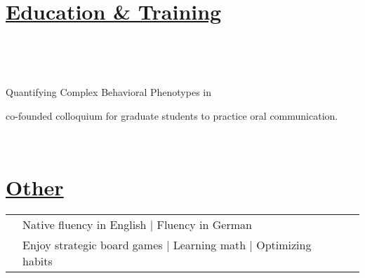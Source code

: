 \documentclass[]{winter-resume-openfont}
\begin{document}
\begin{minipage}[t]{0.65\textwidth}
\sectionsep



\section{\underline{Education \& Training}}
\sectionsep
{} \\
\sectionsep

 \\

\begin{tightemize}
\item {} Quantifying Complex Behavioral Phenotypes in 

\item co-founded colloquium for graduate students to practice oral communication.
\end{tightemize}

\sectionsep

 \\
\sectionsep

\section{\underline{Other}}
\begin{tabular}{lll}
\textbullet{}   & 	Native fluency in English | Fluency in German \\
\textbullet{}   & Enjoy strategic board games | Learning math | Optimizing habits\\
\end{tabular}




\end{minipage} 
\hfill
\end{document}
